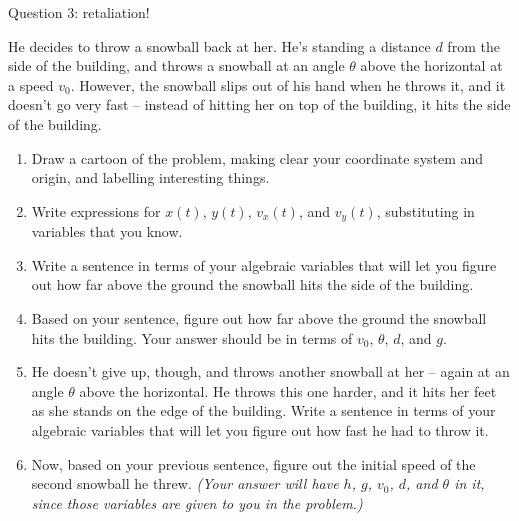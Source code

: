 \documentclass[12pt]{article}
\begin{document}
\newpage

\centerline{\Large Question 3: retaliation!}     

He decides to throw a snowball back at her. He's standing a distance $d$ from the side of the building, and 
throws a snowball at an angle $\theta$ above the horizontal at a speed $v_0$. However, the snowball slips out of his hand when he throws it,
and it doesn't go very fast -- instead of hitting her on top of the building, it hits the side of the building.

\begin{enumerate}

\item Draw a cartoon of the problem, making clear your coordinate system and origin, and
labelling interesting things.

\vspace{2in}

\item Write expressions for $x(t)$, $y(t)$, $v_x(t)$, and $v_y(t)$, substituting in variables that you know.

\vspace{1.5in}

\item Write a sentence in terms of your algebraic variables that will let you figure out how far above the ground 
the snowball hits the side of the building.

\newpage

\item Based on your sentence, figure out how far above the ground the snowball hits the building. Your answer should be 
in terms of $v_0$, $\theta$, $d$, and $g$.

\vspace{3in}
\newpage

\item He doesn't give up, though, and throws another snowball at her -- again at an angle $\theta$ above the horizontal.
He throws this one harder, and it hits her feet as she stands on the edge of the building. Write a sentence in terms of your algebraic variables that will let you figure out how fast he had to throw it. 

\vspace{1.5in}

\item Now, based on your previous sentence, figure out the initial speed of the second snowball he threw. {\it (Your answer will have $h$, $g$, $v_0$, $d$, and $\theta$ in it, since those variables are given to you in the problem.)}

\end{enumerate}
\end{document}

